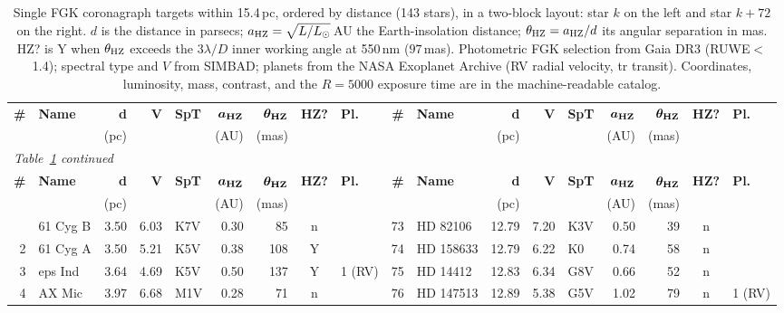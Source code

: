\begin{landscape}
\footnotesize
\setlength{\tabcolsep}{3.6pt}
\begin{longtable}{r l r r l r r c l @{\;\vrule\;} r l r r l r r c l}
\caption{Single FGK coronagraph targets within 15.4\,pc, ordered by distance (143 stars), in a two-block layout: star $k$ on the left and star $k+72$ on the right. $d$ is the distance in parsecs; $a_{\rm HZ}=\sqrt{L/L_\odot}$\,AU the Earth-insolation distance; $\theta_{\rm HZ}=a_{\rm HZ}/d$ its angular separation in mas. HZ? is Y when $\theta_{\rm HZ}$ exceeds the $3\lambda/D$ inner working angle at 550\,nm ($97$\,mas). Photometric FGK selection from Gaia DR3 (RUWE$<$1.4); spectral type and $V$ from SIMBAD; planets from the NASA Exoplanet Archive (RV radial velocity, tr transit). Coordinates, luminosity, mass, contrast, and the $R=5000$ exposure time are in the machine-readable catalog.}\label{tab:catalog}\\
\toprule
\textbf{\#} & \textbf{Name} & \textbf{d} & \textbf{V} & \textbf{SpT} & $\boldsymbol{a_{\rm HZ}}$ & $\boldsymbol{\theta_{\rm HZ}}$ & \textbf{HZ?} & \textbf{Pl.} & \textbf{\#} & \textbf{Name} & \textbf{d} & \textbf{V} & \textbf{SpT} & $\boldsymbol{a_{\rm HZ}}$ & $\boldsymbol{\theta_{\rm HZ}}$ & \textbf{HZ?} & \textbf{Pl.} \\
 & & (pc) & & & (AU) & (mas) & &  &  & & (pc) & & & (AU) & (mas) & &  \\
\midrule
\endfirsthead
\multicolumn{18}{l}{\footnotesize\itshape Table~\ref{tab:catalog} continued}\\
\toprule
\textbf{\#} & \textbf{Name} & \textbf{d} & \textbf{V} & \textbf{SpT} & $\boldsymbol{a_{\rm HZ}}$ & $\boldsymbol{\theta_{\rm HZ}}$ & \textbf{HZ?} & \textbf{Pl.} & \textbf{\#} & \textbf{Name} & \textbf{d} & \textbf{V} & \textbf{SpT} & $\boldsymbol{a_{\rm HZ}}$ & $\boldsymbol{\theta_{\rm HZ}}$ & \textbf{HZ?} & \textbf{Pl.} \\
 & & (pc) & & & (AU) & (mas) & &  &  & & (pc) & & & (AU) & (mas) & &  \\
\midrule
\endhead
\bottomrule
\endfoot
1 & 61 Cyg B & 3.50 & 6.03 & K7V & 0.30 & 85 & n &  & 73 & HD 82106 & 12.79 & 7.20 & K3V & 0.50 & 39 & n &  \\
2 & 61 Cyg A & 3.50 & 5.21 & K5V & 0.38 & 108 & Y &  & 74 & HD 158633 & 12.79 & 6.22 & K0 & 0.74 & 58 & n &  \\
3 & eps Ind & 3.64 & 4.69 & K5V & 0.50 & 137 & Y & 1 (RV) & 75 & HD 14412 & 12.83 & 6.34 & G8V & 0.66 & 52 & n &  \\
4 & AX Mic & 3.97 & 6.68 & M1V & 0.28 & 71 & n &  & 76 & HD 147513 & 12.89 & 5.38 & G5V & 1.02 & 79 & n & 1 (RV) \\

\end{longtable}
\end{landscape}
